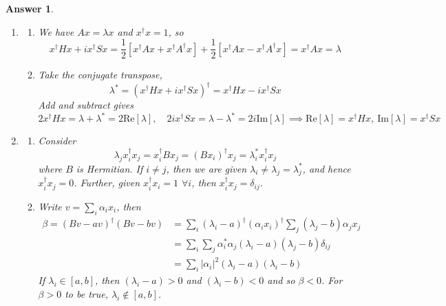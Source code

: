 \documentclass[a4paper]{article}
\newtheorem{ans}{Answer}[section]
\theoremstyle{new}
\begin{document}
\begin{ans}\leavevmode
\begin{enumerate}[label=(\roman*)]
\item 
\begin{enumerate}[label=(\alph*)]
\item We have $Ax=\lambda x$ and $x^\dag x=1$, so
$$x^\dag Hx+ix^\dag Sx=\frac{1}{2}[x^\dag Ax+x^\dag A^\dag x]+\frac{1}{2}[x^\dag Ax-x^\dag A^\dag x]=x^\dag Ax=\lambda$$
\item Take the conjugate transpose,
$$\lambda^*=(x^\dag Hx+ix^\dag Sx)^\dag=x^\dag Hx-ix^\dag Sx$$ Add and subtract gives 
$$2x^\dag Hx=\lambda+\lambda^*=2\text{Re}[\lambda],\quad 2ix^\dag Sx=\lambda-\lambda^*=2i\text{Im}[\lambda]\implies \text{Re}[\lambda]=x^\dag Hx,~\text{Im}[\lambda]=x^\dag Sx$$
\end{enumerate}
\item
\begin{enumerate}[label=(\alph*)]
\item Consider
$$\lambda_jx_i^\dag x_j=x_i^\dag Bx_j=(Bx_i)^\dag x_j=\lambda_i^* x_i^\dag x_j$$
where $B$ is Hermitian. If $i\neq j$, then we are given $\lambda_i\neq\lambda_j=\lambda_j^*$, and hence $x_i^\dag x_j=0$. Further, given $x_i^\dag x_i=1$ $\forall i$, then $x_i^\dag x_j=\delta_{ij}$.
\item Write $v=\sum_i\alpha_ix_i$, then 
\begin{align}
\beta=(Bv-av)^\dag(Bv-bv)&=\sum_i(\lambda_i-a)^\dag(\alpha_ix_i)^\dag\sum_j(\lambda_j-b)\alpha_jx_j\nonumber\\&=\sum_i\sum_j\alpha_i^*\alpha_j(\lambda_i-a)(\lambda_j-b)\delta_{ij}\nonumber\\&=\sum_i|\alpha_i|^2(\lambda_i-a)(\lambda_i-b)\nonumber
\end{align}
If $\lambda_i\in[a,b]$, then $(\lambda_i-a)>0$ and $(\lambda_i-b)<0$ and so $\beta<0$. For $\beta>0$ to be true, $\lambda_i\notin[a,b]$.
\end{enumerate}
\end{enumerate}
\end{ans}
\newpage
\end{document}
